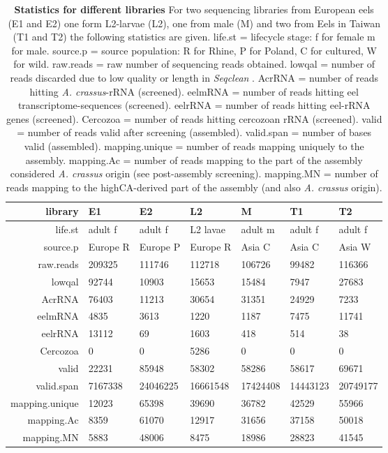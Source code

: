 \begin{table}[!h]
\begin{tabular}{rllllll}
   \hline
library & E1 & E2 & L2 & M & T1 & T2 \\ 
   \hline
life.st & adult f & adult f & L2 lavae & adult m & adult f & adult f \\ 
  source.p & Europe R & Europe P & Europe R & Asia C & Asia C & Asia W \\ 
  raw.reads & 209325 & 111746 & 112718 & 106726 & 99482 & 116366 \\ 
  lowqal & 92744 & 10903 & 15653 & 15484 & 7947 & 27683 \\ 
  AcrRNA & 76403 & 11213 & 30654 & 31351 & 24929 & 7233 \\ 
  eelmRNA & 4835 & 3613 & 1220 & 1187 & 7475 & 11741 \\ 
  eelrRNA & 13112 & 69 & 1603 & 418 & 514 & 38 \\ 
  Cercozoa & 0 & 0 & 5286 & 0 & 0 & 0 \\ 
  valid & 22231 & 85948 & 58302 & 58286 & 58617 & 69671 \\ 
  valid.span & 7167338 & 24046225 & 16661548 & 17424408 & 14443123 & 20749177 \\ 
  mapping.unique & 12023 & 65398 & 39690 & 36782 & 42529 & 55966 \\ 
  mapping.Ac &  8359 & 61070 & 12917 & 31656 & 37158 & 50018 \\ 
  mapping.MN &  5883 & 48006 &  8475 & 18986 & 28823 & 41545 \\ 
  \hline
\end{tabular}
  \caption[Pyro-sequencing library statistics]{\textbf{Statistics for different 
      libraries} 
    For two sequencing libraries from European eels (E1 and E2)
    one form L2-larvae (L2), one from male (M) and two from Eels in Taiwan
    (T1 and T2) the following statistics are given. life.st = lifecycle
    stage: f for female m for male. source.p = source population: R for
    Rhine, P for Poland, C for cultured, W for wild. raw.reads = raw
    number of sequencing reads obtained. lowqal = number of reads
    discarded due to low quality or length in \textit{Seqclean}
    \cite{tgicl_pertea}. AcrRNA = number of reads hitting
    \textit{A. crassus}-rRNA (screened). eelmRNA = number of reads hitting
    eel transcriptome-sequences (screened). eelrRNA = number of reads
    hitting eel-rRNA genes (screened). Cercozoa = number of reads hitting
    cercozoan rRNA (screened). valid = number of reads valid after
    screening (assembled). valid.span = number of bases valid (assembled).
    mapping.unique = number of reads mapping uniquely to the
    assembly. mapping.Ac = number of reads mapping to the part of the
    assembly considered \textit{A. crassus} origin (see post-assembly
    screening). mapping.MN = number of reads mapping to the highCA-derived
    part of the assembly (and also \textit{A. crassus} origin).}
  \label{screening-lib}
\end{table}

